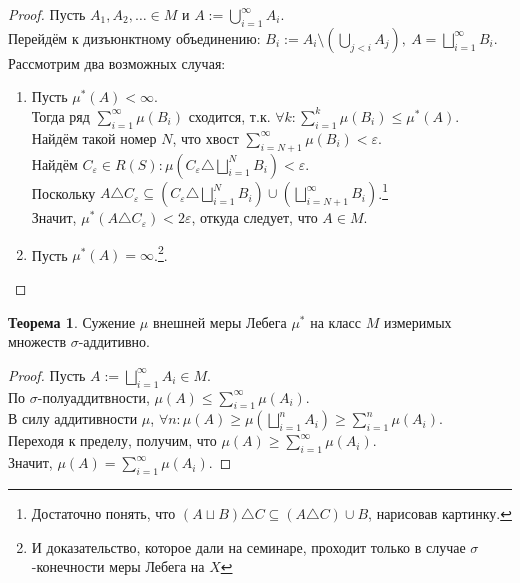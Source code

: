 \documentclass[11pt,a4paper]{report}
\def\eps{\varepsilon}
\theoremstyle{definition}
\theoremstyle{definition}
\newtheorem{theorem}{Теорема}[section]
\theoremstyle{definition}
\begin{document}
	\begin{proof}
		Пусть $ A_{1}, A_{2}, \dots \in M $  и $ A := \bigcup_{i=1}^{\infty}{A_{i}} $.\\
		Перейдём к дизъюнктному объединению: $ B_{i} := A_{i} \setminus \left (\bigcup_{j<i}{A_{j}}\right ),\ A = \bigsqcup_{i=1}^{\infty}{B_{i}} $.\\
		Рассмотрим два возможных случая:
		\begin{enumerate}
			\item Пусть $ \mu^{*}(A) < \infty $.\\ 
			Тогда ряд $ \sum_{i=1}^{\infty}{\mu(B_{i})} $ сходится, т.к. $ \forall k: \sum_{i=1}^{k}{\mu(B_{i})}  \le \mu^{*}(A) $.\\
			Найдём такой номер $ N $, что хвост $ \sum_{i=N+1}^{\infty}{\mu(B_{i})} < \eps $.\\ 
			Найдём $ C_{\eps} \in R(S): \mu\left (C_{\eps} \triangle \bigsqcup_{i=1}^{N}{B_{i}} \right ) < \eps $.\\
			Поскольку $ A \triangle C_{\eps} \subseteq \left (C_{\eps} \triangle \bigsqcup_{i=1}^{N}{B_{i}} \right ) \cup \left (\bigsqcup_{i=N+1}^{\infty}B_{i}\right ) $.\footnote{Достаточно понять, что $ (A \sqcup B) \triangle C \subseteq (A \triangle C) \cup B $, нарисовав картинку.}\\
			Значит, $ \mu^{*}(A \triangle C_{\eps}) < 2\eps $, откуда следует, что $ A \in M $.
			\item Пусть $ \mu^{*}(A) = \infty $.\footnote{И доказательство, которое дали на семинаре, проходит только в случае $ \sigma $-конечности меры Лебега на $ X $}.
		\end{enumerate}
	\end{proof}
	\begin{theorem}
		Сужение $ \mu $ внешней меры Лебега $ \mu^{*} $ на класс $ M $ измеримых множеств $ \sigma $-аддитивно.
	\end{theorem}
	\begin{proof}
		Пусть $ A := \bigsqcup_{i=1}^{\infty}{A_{i}} \in M $.\\
		По $ \sigma $-полуаддитвности, $ \mu(A) \le \sum_{i=1}^{\infty}{\mu(A_{i})} $.\\
		В силу аддитивности $ \mu $, $ \forall n: \mu(A) \ge \mu\left (\bigsqcup_{i=1}^{n}{A_{i}}\right )  \ge \sum_{i=1}^{n}{\mu(A_{i})} $.\\ 
		Переходя к пределу, получим, что $ \mu(A) \ge \sum_{i=1}^{\infty}{\mu(A_{i})} $.\\
		Значит, $ \mu(A) = \sum_{i=1}^{\infty}{\mu(A_{i})} $.
	\end{proof}
\end{document}
